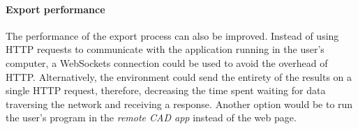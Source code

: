 \paragraph{Export performance}
The performance of the export process can also be improved.
Instead of using HTTP requests to communicate with the application running in the user's computer, a WebSockets connection\cite{rfc6455} could be used to avoid the overhead of HTTP.
Alternatively, the environment could send the entirety of the results on a single HTTP request, therefore, decreasing the time spent waiting for data traversing the network and receiving a response.
Another option would be to run the user's program in the \textit{remote CAD app} instead of the web page.

































